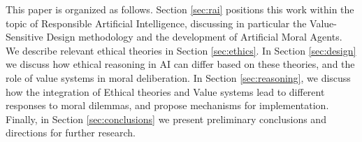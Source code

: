 \documentclass[twocolumn]{article}
\begin{document}
This paper is organized as follows. Section \ref{sec:rai} positions this work within the topic of Responsible Artificial Intelligence, discussing in particular the Value-Sensitive Design methodology and  the development of Artificial Moral Agents.  We describe relevant ethical theories in Section \ref{sec:ethics}. In Section \ref{sec:design} we discuss how ethical reasoning in AI can differ based on these theories, and the role of value systems in moral deliberation. %
In Section \ref{sec:reasoning}, we discuss how the integration of Ethical theories and Value systems lead to different responses to moral dilemmas, and propose mechanisms for implementation. Finally, in Section \ref{sec:conclusions} we present preliminary conclusions and directions for further research.





\end{document}
